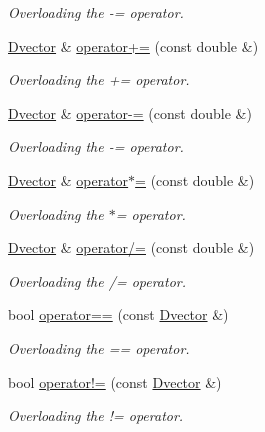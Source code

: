 \begin{DoxyCompactItemize}
\begin{DoxyCompactList}\small\item\em Overloading the -\/= operator. \end{DoxyCompactList}\item 
\hyperlink{classDvector}{Dvector} \& \hyperlink{classDvector_a37ef56d7296def48977784289854f368}{operator+=} (const double \&)
\begin{DoxyCompactList}\small\item\em Overloading the += operator. \end{DoxyCompactList}\item 
\hyperlink{classDvector}{Dvector} \& \hyperlink{classDvector_aeda9c71108651fe543ab0f739a6dc1cb}{operator-\/=} (const double \&)
\begin{DoxyCompactList}\small\item\em Overloading the -\/= operator. \end{DoxyCompactList}\item 
\hyperlink{classDvector}{Dvector} \& \hyperlink{classDvector_a28feeab88aef45f10904d26ffb3d0467}{operator$\ast$=} (const double \&)
\begin{DoxyCompactList}\small\item\em Overloading the $\ast$= operator. \end{DoxyCompactList}\item 
\hyperlink{classDvector}{Dvector} \& \hyperlink{classDvector_a476c9bf39a35968e9693a6af4dade795}{operator/=} (const double \&)
\begin{DoxyCompactList}\small\item\em Overloading the /= operator. \end{DoxyCompactList}\item 
bool \hyperlink{classDvector_a696e2627978288f060beb106c98c7b3c}{operator==} (const \hyperlink{classDvector}{Dvector} \&)
\begin{DoxyCompactList}\small\item\em Overloading the == operator. \end{DoxyCompactList}\item 
bool \hyperlink{classDvector_a9cfad018b4dc733912472b38be0d2fe1}{operator!=} (const \hyperlink{classDvector}{Dvector} \&)
\begin{DoxyCompactList}\small\item\em Overloading the != operator. \end{DoxyCompactList}\end{DoxyCompactItemize}


